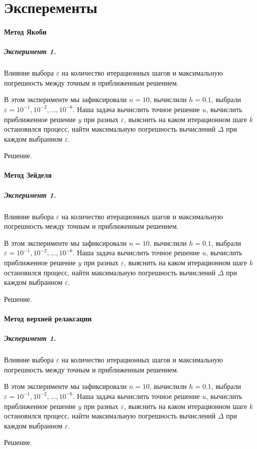 \section{Эксперементы}

\paragraph{Метод Якоби}

\subparagraph{Эксперимент 1.}

Влияние выбора $\varepsilon$ на количество итерационных шагов и максимальную погрешность между точным и приближенным решением.

В этом эксперименте мы зафиксировали $n = 10$, вычислили $h=0.1$, выбрали $\varepsilon = 10^{-1}, 10^{-2}, \dots, 10^{-6}$. Наша задача вычислить точное решение $u$, вычислить приближенное решение $y$ при разных $\varepsilon$, выяснить на каком итерационном шаге $k$  остановился процесс, найти максимальную погрешность вычислений $\Delta$ при каждом выбранном $\varepsilon$.

Решение.



\paragraph{Метод Зейделя}

\subparagraph{Эксперимент 1.}

Влияние выбора $\varepsilon$ на количество итерационных шагов и максимальную погрешность между точным и приближенным решением.

В этом эксперименте мы зафиксировали $n = 10$, вычислили $h=0.1$, выбрали $\varepsilon = 10^{-1}, 10^{-2}, \dots, 10^{-6}$. Наша задача вычислить точное решение $u$, вычислить приближенное решение $y$ при разных $\varepsilon$, выяснить на каком итерационном шаге $k$  остановился процесс, найти максимальную погрешность вычислений $\Delta$ при каждом выбранном $\varepsilon$.

Решение.



\paragraph{Метод верхней релаксации}

\subparagraph{Эксперимент 1.}

Влияние выбора $\varepsilon$ на количество итерационных шагов и максимальную погрешность между точным и приближенным решением.

В этом эксперименте мы зафиксировали $n = 10$, вычислили $h=0.1$, выбрали $\varepsilon = 10^{-1}, 10^{-2}, \dots, 10^{-6}$. Наша задача вычислить точное решение $u$, вычислить приближенное решение $y$ при разных $\varepsilon$, выяснить на каком итерационном шаге $k$  остановился процесс, найти максимальную погрешность вычислений $\Delta$ при каждом выбранном $\varepsilon$.

Решение.

